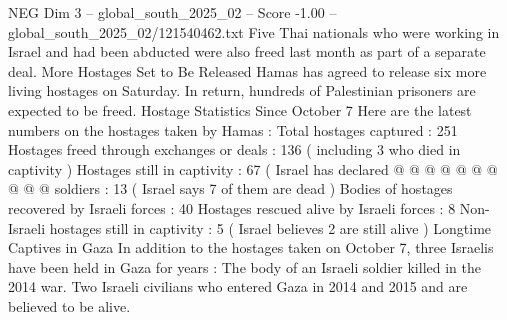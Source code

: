 \begin{textsample}{NEG Dim 3 – global\_south\_2025\_02 – Score -1.00 – global\_south\_2025\_02/121540462.txt}
Five Thai nationals who were working in Israel and had been abducted were also freed last month as part of a separate deal.
More Hostages Set to Be Released Hamas has agreed to release six more living hostages on Saturday.
In return, hundreds of Palestinian prisoners are expected to be freed.
Hostage Statistics Since October 7 Here are the latest numbers on the hostages taken by Hamas : Total hostages captured : 251 Hostages freed through exchanges or deals : 136 ( including 3 who died in captivity ) Hostages still in captivity : 67 ( Israel has declared @ @ @ @ @ @ @ @ @ @ soldiers : 13 ( Israel says 7 of them are dead ) Bodies of hostages recovered by Israeli forces : 40 Hostages rescued alive by Israeli forces : 8 Non-Israeli hostages still in captivity : 5 ( Israel believes 2 are still alive ) Longtime Captives in Gaza In addition to the hostages taken on October 7, three Israelis have been held in Gaza for years : The body of an Israeli soldier killed in the 2014 war.
Two Israeli civilians who entered Gaza in 2014 and 2015 and are believed to be alive.

\end{textsample}
